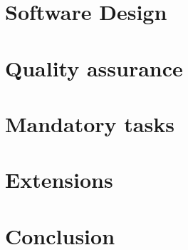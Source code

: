 


	
	\frontmatter
		
	\newpage	
	\tableofcontents 
	
	
	\mainmatter
	
	\chapter{Software Design}
	
	
	\chapter{Quality assurance}
	
	 
	
	\chapter{Mandatory tasks}
	
	
	
	
	
	\chapter{Extensions}
	
	
	
	\chapter{Conclusion}
	
	
	\backmatter
	
	

